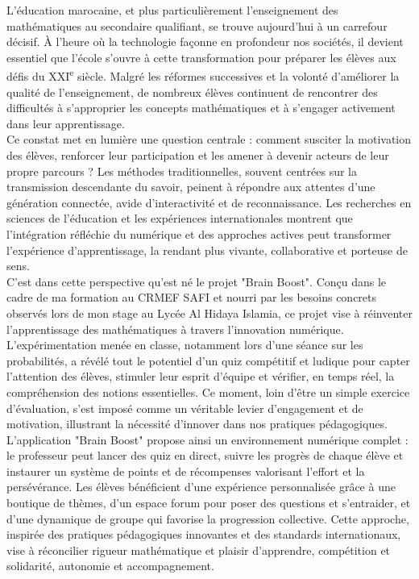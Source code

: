\documentclass[a4paper,11pt]{report}
\begin{document}
L'éducation marocaine, et plus particulièrement l'enseignement des mathématiques au secondaire qualifiant, se trouve aujourd'hui à un carrefour décisif. À l'heure où la technologie façonne en profondeur nos sociétés, il devient essentiel que l'école s'ouvre à cette transformation pour préparer les élèves aux défis du XXI\textsuperscript{e} siècle. Malgré les réformes successives et la volonté d'améliorer la qualité de l'enseignement, de nombreux élèves continuent de rencontrer des difficultés à s'approprier les concepts mathématiques et à s'engager activement dans leur apprentissage.\\
Ce constat met en lumière une question centrale : comment susciter la motivation des élèves, renforcer leur participation et les amener à devenir acteurs de leur propre parcours ? Les méthodes traditionnelles, souvent centrées sur la transmission descendante du savoir, peinent à répondre aux attentes d'une génération connectée, avide d'interactivité et de reconnaissance. Les recherches en sciences de l'éducation et les expériences internationales montrent que l'intégration réfléchie du numérique et des approches actives peut transformer l'expérience d'apprentissage, la rendant plus vivante, collaborative et porteuse de sens.\\
C'est dans cette perspective qu'est né le projet "Brain Boost". Conçu dans le cadre de ma formation au CRMEF SAFI et nourri par les besoins concrets observés lors de mon stage au Lycée Al Hidaya Islamia, ce projet vise à réinventer l'apprentissage des mathématiques à travers l'innovation numérique. L'expérimentation menée en classe, notamment lors d'une séance sur les probabilités, a révélé tout le potentiel d'un quiz compétitif et ludique pour capter l'attention des élèves, stimuler leur esprit d'équipe et vérifier, en temps réel, la compréhension des notions essentielles. Ce moment, loin d'être un simple exercice d'évaluation, s'est imposé comme un véritable levier d'engagement et de motivation, illustrant la nécessité d'innover dans nos pratiques pédagogiques.\\
L'application "Brain Boost" propose ainsi un environnement numérique complet : le professeur peut lancer des quiz en direct, suivre les progrès de chaque élève et instaurer un système de points et de récompenses valorisant l'effort et la persévérance. Les élèves bénéficient d'une expérience personnalisée grâce à une boutique de thèmes, d'un espace forum pour poser des questions et s'entraider, et d'une dynamique de groupe qui favorise la progression collective. Cette approche, inspirée des pratiques pédagogiques innovantes et des standards internationaux, vise à réconcilier rigueur mathématique et plaisir d'apprendre, compétition et solidarité, autonomie et accompagnement.\\
\end{document}
